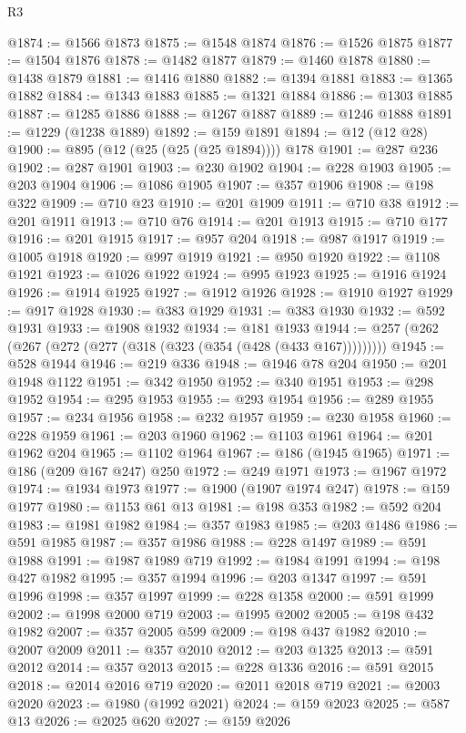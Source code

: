 \begin{lexlean}{R3}
\begin{coremodule}
@1874 := @1566 @1873
@1875 := @1548 @1874
@1876 := @1526 @1875
@1877 := @1504 @1876
@1878 := @1482 @1877
@1879 := @1460 @1878
@1880 := @1438 @1879
@1881 := @1416 @1880
@1882 := @1394 @1881
@1883 := @1365 @1882
@1884 := @1343 @1883
@1885 := @1321 @1884
@1886 := @1303 @1885
@1887 := @1285 @1886
@1888 := @1267 @1887
@1889 := @1246 @1888
@1891 := @1229 (@1238 @1889)
@1892 := @159 @1891
@1894 := @12 (@12 @28)
@1900 := @895 (@12 (@25 (@25 (@25 @1894)))) @178
@1901 := @287 @236
@1902 := @287 @1901
@1903 := @230 @1902
@1904 := @228 @1903
@1905 := @203 @1904
@1906 := @1086 @1905
@1907 := @357 @1906
@1908 := @198 @322
@1909 := @710 @23
@1910 := @201 @1909
@1911 := @710 @38
@1912 := @201 @1911
@1913 := @710 @76
@1914 := @201 @1913
@1915 := @710 @177
@1916 := @201 @1915
@1917 := @957 @204
@1918 := @987 @1917
@1919 := @1005 @1918
@1920 := @997 @1919
@1921 := @950 @1920
@1922 := @1108 @1921
@1923 := @1026 @1922
@1924 := @995 @1923
@1925 := @1916 @1924
@1926 := @1914 @1925
@1927 := @1912 @1926
@1928 := @1910 @1927
@1929 := @917 @1928
@1930 := @383 @1929
@1931 := @383 @1930
@1932 := @592 @1931
@1933 := @1908 @1932
@1934 := @181 @1933
@1944 := @257 (@262 (@267 (@272 (@277 (@318 (@323 (@354 (@428 (@433 @167)))))))))
@1945 := @528 @1944
@1946 := @219 @336
@1948 := @1946 @78 @204
@1950 := @201 @1948 @1122
@1951 := @342 @1950
@1952 := @340 @1951
@1953 := @298 @1952
@1954 := @295 @1953
@1955 := @293 @1954
@1956 := @289 @1955
@1957 := @234 @1956
@1958 := @232 @1957
@1959 := @230 @1958
@1960 := @228 @1959
@1961 := @203 @1960
@1962 := @1103 @1961
@1964 := @201 @1962 @204
@1965 := @1102 @1964
@1967 := @186 (@1945 @1965)
@1971 := @186 (@209 @167 @247) @250
@1972 := @249 @1971
@1973 := @1967 @1972
@1974 := @1934 @1973
@1977 := @1900 (@1907 @1974 @247)
@1978 := @159 @1977
@1980 := @1153 @61 @13
@1981 := @198 @353
@1982 := @592 @204
@1983 := @1981 @1982
@1984 := @357 @1983
@1985 := @203 @1486
@1986 := @591 @1985
@1987 := @357 @1986
@1988 := @228 @1497
@1989 := @591 @1988
@1991 := @1987 @1989 @719
@1992 := @1984 @1991
@1994 := @198 @427 @1982
@1995 := @357 @1994
@1996 := @203 @1347
@1997 := @591 @1996
@1998 := @357 @1997
@1999 := @228 @1358
@2000 := @591 @1999
@2002 := @1998 @2000 @719
@2003 := @1995 @2002
@2005 := @198 @432 @1982
@2007 := @357 @2005 @599
@2009 := @198 @437 @1982
@2010 := @2007 @2009
@2011 := @357 @2010
@2012 := @203 @1325
@2013 := @591 @2012
@2014 := @357 @2013
@2015 := @228 @1336
@2016 := @591 @2015
@2018 := @2014 @2016 @719
@2020 := @2011 @2018 @719
@2021 := @2003 @2020
@2023 := @1980 (@1992 @2021)
@2024 := @159 @2023
@2025 := @587 @13
@2026 := @2025 @620
@2027 := @159 @2026

\end{coremodule}
\end{lexlean}
